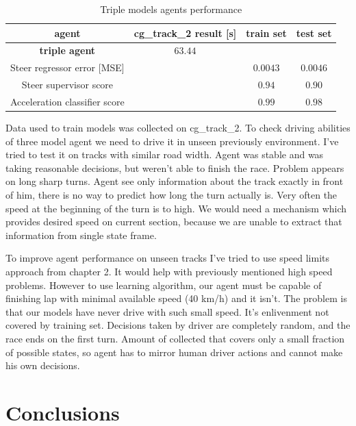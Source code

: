 \documentclass[declaration,shortabstract,english,inz]{iithesis}
\begin{document}
 \begin{table}[h]
    \centering
    \begin{tabular}{ |c|c|c|c|}
          \hline
          agent & cg\_track\_2 result [s] & train set & test set \\
          \hline
          \textbf{triple agent} & $63.44$ &   &  \\
          \hline
          Steer regressor error [MSE]&   & $0.0043$ & $0.0046$\\
          \hline
          Steer supervisor score & & $0.94$ & $0.90$ \\
          \hline
          Acceleration classifier score &  & $0.99$ & $0.98$ \\
          \hline       
        \end{tabular}
        \caption{Triple models agents performance}
        \label{tab:triple_models_results}

\end{table}

Data used to train models was collected on cg\_track\_2. To check driving abilities of three model agent we need to drive it in unseen previously environment. I've tried to test it on tracks with similar road width. Agent was stable and was taking reasonable decisions, but weren't able to finish the race. Problem appears on long sharp turns. Agent see only information about the track exactly in front of him, there is no way to predict how long the turn actually is. Very often the speed at the beginning of the turn is to high. We would need a mechanism which provides desired speed on current section, because we are unable to extract that information from single state frame.

To improve agent performance on unseen tracks I've tried to use speed limits approach from chapter 2. It would help with previously mentioned high speed problems. However to use learning algorithm, our agent must be capable of finishing lap with minimal available speed (40 km/h) and it isn't. The problem is that our models have never drive with such small speed. It's enlivenment not covered by training set. Decisions taken by driver are completely random, and the race ends on the first turn. Amount of collected that covers only a small fraction of possible states, so agent has to mirror human driver actions and cannot make his own decisions.


\chapter{Conclusions}
\end{document}
